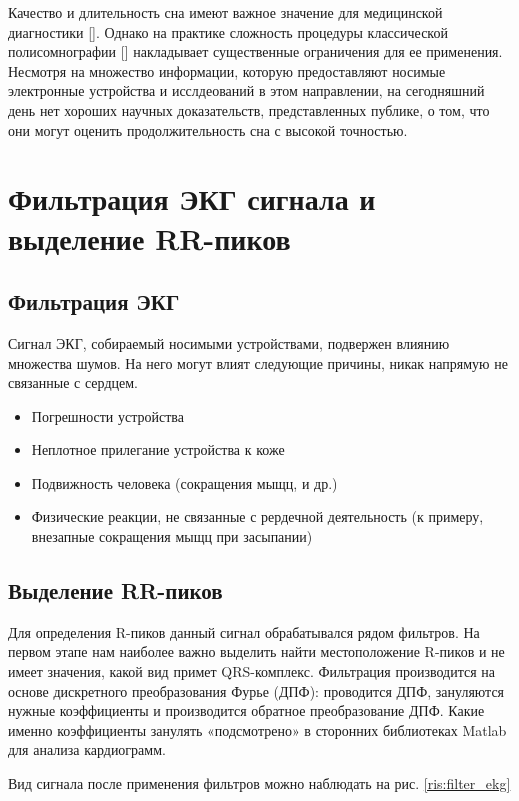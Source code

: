 Качество и длительность сна имеют важное значение для медицинской диагностики []. Однако на практике сложность процедуры классической полисомнографии [] накладывает существенные ограничения для ее применения. Несмотря на множество информации, которую предоставляют носимые электронные устройства и исслдеований в этом направлении, на сегодняшний день нет хороших научных доказательств, представленных публике, о том, что они могут оценить продолжительность сна с высокой точностью.

\section{Фильтрация ЭКГ сигнала и выделение RR-пиков}
\subsection{Фильтрация ЭКГ}
Сигнал ЭКГ, собираемый носимыми устройствами, подвержен влиянию множества шумов. На него могут влият следующие причины, никак напрямую не связанные с сердцем.
\begin{itemize}
	\item Погрешности устройства
	\item Неплотное прилегание устройства к коже
	\item Подвижность человека (сокращения мыщц, и др.)
	\item Физические реакции, не связанные с рердечной деятельность (к примеру, внезапные сокращения мыщц при засыпании)
\end{itemize}

\subsection{Выделение RR-пиков}
Для определения R-пиков данный сигнал обрабатывался рядом фильтров. На первом этапе нам наиболее важно выделить найти местоположение R-пиков и не имеет значения, какой вид примет QRS-комплекс. Фильтрация производится на основе дискретного преобразования Фурье (ДПФ): проводится ДПФ, зануляются нужные коэффициенты и производится обратное преобразование ДПФ. Какие именно коэффициенты занулять «подсмотрено» в сторонних библиотеках Matlab для анализа кардиограмм.

Вид сигнала после применения фильтров можно наблюдать на рис.  \ref{ris:filter_ekg}

